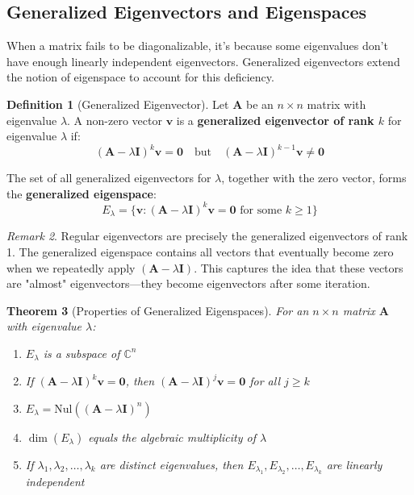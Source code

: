 \documentclass[12pt]{article}
\numberwithin{equation}{section}
\newcommand{\vect}[1]{\boldsymbol{#1}}   %
\newcommand{\mat}[1]{\mathbf{#1}}        %
\theoremstyle{plain}
\newtheorem{theorem}{Theorem}[section]
\theoremstyle{definition}
\newtheorem{definition}[theorem]{Definition}
\theoremstyle{remark}
\newtheorem{remark}[theorem]{Remark}
\begin{document}
\subsection{Generalized Eigenvectors and Eigenspaces}

When a matrix fails to be diagonalizable, it's because some eigenvalues don't have enough linearly independent eigenvectors. Generalized eigenvectors extend the notion of eigenspace to account for this deficiency.

\begin{definition}[Generalized Eigenvector]
Let $\mat{A}$ be an $n \times n$ matrix with eigenvalue $\lambda$. A non-zero vector $\vect{v}$ is a \textbf{generalized eigenvector of rank $k$} for eigenvalue $\lambda$ if:
$$(\mat{A} - \lambda\mat{I})^k \vect{v} = \vect{0} \quad \text{but} \quad (\mat{A} - \lambda\mat{I})^{k-1} \vect{v} \neq \vect{0}$$

The set of all generalized eigenvectors for $\lambda$, together with the zero vector, forms the \textbf{generalized eigenspace}:
$$E_{\lambda} = \{\vect{v} : (\mat{A} - \lambda\mat{I})^k \vect{v} = \vect{0} \text{ for some } k \geq 1\}$$
\end{definition}

\begin{remark}
Regular eigenvectors are precisely the generalized eigenvectors of rank 1. The generalized eigenspace contains all vectors that eventually become zero when we repeatedly apply $(\mat{A} - \lambda\mat{I})$. This captures the idea that these vectors are "almost" eigenvectors—they become eigenvectors after some iteration.
\end{remark}

\begin{theorem}[Properties of Generalized Eigenspaces]
For an $n \times n$ matrix $\mat{A}$ with eigenvalue $\lambda$:
\begin{enumerate}
\item $E_{\lambda}$ is a subspace of $\mathbb{C}^n$
\item If $(\mat{A} - \lambda\mat{I})^k \vect{v} = \vect{0}$, then $(\mat{A} - \lambda\mat{I})^j \vect{v} = \vect{0}$ for all $j \geq k$
\item $E_{\lambda} = \text{Nul}((\mat{A} - \lambda\mat{I})^n)$
\item $\dim(E_{\lambda})$ equals the algebraic multiplicity of $\lambda$
\item If $\lambda_1, \lambda_2, \ldots, \lambda_k$ are distinct eigenvalues, then $E_{\lambda_1}, E_{\lambda_2}, \ldots, E_{\lambda_k}$ are linearly independent
\end{enumerate}
\end{theorem}
\end{document}
